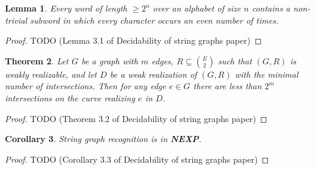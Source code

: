 \documentclass[12pt]{article}
\theoremstyle{plain} %
\newtheorem{theorem}{Theorem}
\newtheorem{lemma}[theorem]{Lemma}
\newtheorem{corollary}[theorem]{Corollary}
\begin{document}
\begin{lemma}
    Every word of length \(\geq 2^n\) over an alphabet of size \(n\) contains a non-trivial subword in which every character occurs an even number of times.
\end{lemma}

\begin{proof}
TODO (Lemma 3.1 of Decidability of string graphs paper)
\end{proof}

\begin{theorem}
    Let \(G\) be a graph with \(m\) edges, \(R \subseteq \binom{E}{2}\) such that \((G, R)\) is weakly realizable, and let \(D\) 
    be a weak realization of \((G, R)\) with the minimal number of intersections. Then for any edge \(e \in G\) 
    there are less than \(2^m\) intersections on the curve realizing \(e\) in \(D\).
\end{theorem}

\begin{proof}
TODO (Theorem 3.2 of Decidability of string graphs paper)
\end{proof}

\begin{corollary}
    String graph recognition is in \textbf{NEXP}.
\end{corollary}

\begin{proof}
TODO (Corollary 3.3 of Decidability of string graphs paper)
\end{proof}
\end{document}
